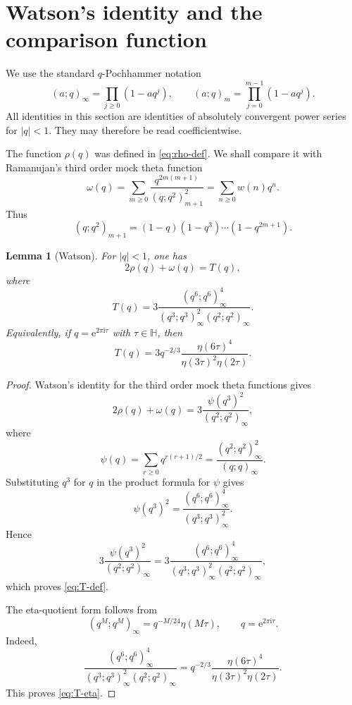 \documentclass[11pt]{article}
\newtheorem{lemma}[theorem]{Lemma}
\theoremstyle{remark}
\newcommand{\ii}{\mathrm i}
\newcommand{\e}{\mathrm e}
\newcommand{\Hh}{\mathbb H}
\begin{document}
\section{Watson's identity and the comparison function}\label{sec:watson}

We use the standard $q$-Pochhammer notation
\[
(a;q)_\infty=\prod_{j\geq0}(1-aq^j),
\qquad
(a;q)_m=\prod_{j=0}^{m-1}(1-aq^j).
\]
All identities in this section are identities of absolutely convergent power series for $|q|<1$.
They may therefore be read coefficientwise.

The function $\rho(q)$ was defined in \eqref{eq:rho-def}. We shall compare it with Ramanujan's third order mock theta function
\begin{equation}\label{eq:omega-def}
\omega(q)
=
\sum_{m\geq0}\frac{q^{2m(m+1)}}{(q;q^2)_{m+1}^2}
=
\sum_{n\geq0}w(n)q^n.
\end{equation}
Thus
\[
(q;q^2)_{m+1}
=
(1-q)(1-q^3)\cdots(1-q^{2m+1}).
\]

\begin{lemma}[Watson]\label{lem:watson}
For $|q|<1$, one has
\begin{equation}\label{eq:watson}
2\rho(q)+\omega(q)=T(q),
\end{equation}
where
\begin{equation}\label{eq:T-def}
T(q)=3\frac{(q^6;q^6)_\infty^4}{(q^3;q^3)_\infty^2(q^2;q^2)_\infty}.
\end{equation}
Equivalently, if $q=\e^{2\pi\ii\tau}$ with $\tau\in\Hh$, then
\begin{equation}\label{eq:T-eta}
T(q)=3q^{-2/3}\frac{\eta(6\tau)^4}{\eta(3\tau)^2\eta(2\tau)}.
\end{equation}
\end{lemma}

\begin{proof}
Watson's identity for the third order mock theta functions gives \cite{Watson}
\[
2\rho(q)+\omega(q)
=
3\frac{\psi(q^3)^2}{(q^2;q^2)_\infty},
\]
where
\[
\psi(q)=\sum_{r\geq0}q^{r(r+1)/2}
=
\frac{(q^2;q^2)_\infty^2}{(q;q)_\infty}.
\]
Substituting $q^3$ for $q$ in the product formula for $\psi$ gives
\[
\psi(q^3)^2
=
\frac{(q^6;q^6)_\infty^4}{(q^3;q^3)_\infty^2}.
\]
Hence
\[
3\frac{\psi(q^3)^2}{(q^2;q^2)_\infty}
=
3\frac{(q^6;q^6)_\infty^4}{(q^3;q^3)_\infty^2(q^2;q^2)_\infty},
\]
which proves \eqref{eq:T-def}.

The eta-quotient form follows from
\[
(q^M;q^M)_\infty=q^{-M/24}\eta(M\tau),
\qquad q=\e^{2\pi\ii\tau}.
\]
Indeed,
\[
\frac{(q^6;q^6)_\infty^4}{(q^3;q^3)_\infty^2(q^2;q^2)_\infty}
=
q^{-2/3}\frac{\eta(6\tau)^4}{\eta(3\tau)^2\eta(2\tau)}.
\]
This proves \eqref{eq:T-eta}.
\end{proof}
\end{document}
